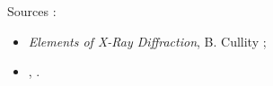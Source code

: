 \documentclass[a4paper,justified,twoside,nobib]{tufte-book}
\renewcommand{\=}[1]{\stackrel{#1}{=}} %
\begin{document}



Sources :
    \begin{itemize}
        \item \emph{Elements of X-Ray Diffraction}, B. Cullity ;
        \item \emph{}, .
    \end{itemize}

    \vspace{2cm}


\end{document}

